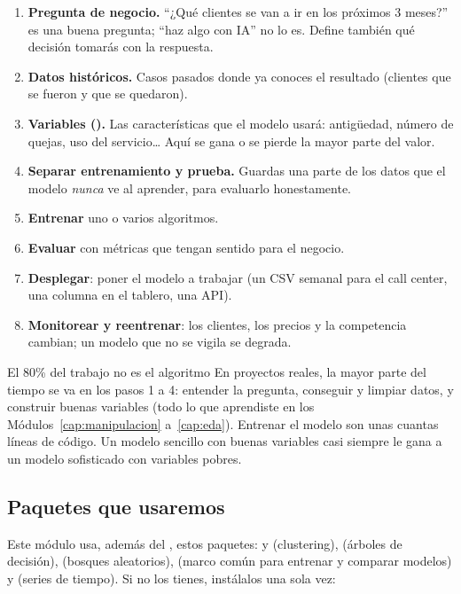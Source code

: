 \begin{enumerate}
  \item \textbf{Pregunta de negocio.} ``¿Qué clientes se van a ir en los
        próximos 3 meses?'' es una buena pregunta; ``haz algo con IA'' no lo
        es. Define también qué decisión tomarás con la respuesta.
  \item \textbf{Datos históricos.} Casos pasados donde ya conoces el resultado
        (clientes que se fueron y que se quedaron).
  \item \textbf{Variables ().} Las características que el
        modelo usará: antigüedad, número de quejas, uso del servicio\ldots{}
        Aquí se gana o se pierde la mayor parte del valor.
  \item \textbf{Separar entrenamiento y prueba.} Guardas una parte de los datos
        que el modelo \emph{nunca} ve al aprender, para evaluarlo honestamente.
  \item \textbf{Entrenar} uno o varios algoritmos.
  \item \textbf{Evaluar} con métricas que tengan sentido para el negocio.
  \item \textbf{Desplegar}: poner el modelo a trabajar (un CSV semanal para el
        call center, una columna en el tablero, una API).
  \item \textbf{Monitorear y reentrenar}: los clientes, los precios y la
        competencia cambian; un modelo que no se vigila se degrada.
\end{enumerate}

\begin{negocio}{El 80\% del trabajo no es el algoritmo}
En proyectos reales, la mayor parte del tiempo se va en los pasos 1 a 4:
entender la pregunta, conseguir y limpiar datos, y construir buenas variables
(todo lo que aprendiste en los Módulos~\ref{cap:manipulacion} a~\ref{cap:eda}).
Entrenar el modelo son unas cuantas líneas de código. Un modelo sencillo con
buenas variables casi siempre le gana a un modelo sofisticado con variables
pobres.
\end{negocio}

\subsection{Paquetes que usaremos}

Este módulo usa, además del , estos paquetes: 
y  (clustering),  (árboles de decisión),
 (bosques aleatorios),  (marco común para
entrenar y comparar modelos) y  (series de tiempo). Si no los
tienes, instálalos una sola vez:

